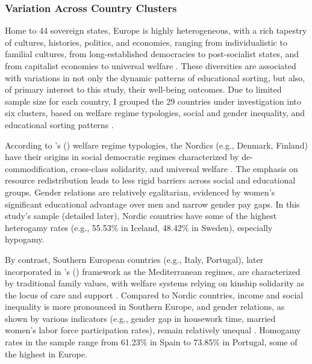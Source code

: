\subsubsection{Variation Across Country Clusters}

Home to 44 sovereign states, Europe is highly heterogeneous, with a rich tapestry of cultures, histories, politics, and economies, ranging from individualistic to familial cultures, from long-established democracies to post-socialist states, and from capitalist economies to universal welfare \parencite{castlesWorldsFamiliesRegimes2008,esping-andersenThreeWorldsWelfare1990,ferreraSouthernModelWelfare1996}. These diversities are associated with variations in not only the dynamic patterns of educational sorting, but also, of primary interest to this study, their well-being outcomes. Due to limited sample size for each country, I grouped the 29 countries under investigation into six clusters, based on welfare regime typologies, social and gender inequality, and educational sorting patterns \parencite{dehauwReversedGenderGap2017,domanskiEducationalHomogamy222007}.

According to \citeauthor{esping-andersenThreeWorldsWelfare1990}'s (\citeyear{esping-andersenThreeWorldsWelfare1990}) welfare regime typologies, the Nordics (e.g., Denmark, Finland) have their origins in social democratic regimes characterized by de-commodification, cross-class solidarity, and universal welfare \parencite{artsModelsWelfareState2010}. The emphasis on resource redistribution leads to less rigid barriers across social and educational groups. Gender relations are relatively egalitarian, evidenced by women's significant educational advantage over men and narrow gender pay gaps. In this study's sample (detailed later), Nordic countries have some of the highest heterogamy rates (e.g., 55.53\% in Iceland, 48.42\% in Sweden), especially hypogamy.

By contrast, Southern European countries (e.g., Italy, Portugal), later incorporated in \citeauthor{esping-andersenThreeWorldsWelfare1990}'s (\citeyear{esping-andersenThreeWorldsWelfare1990}) framework as the Mediterranean regimes, are characterized by traditional family values, with welfare systems relying on kinship solidarity as the locus of care and support \parencite{ferreraSouthernModelWelfare1996}. Compared to Nordic countries, income and social inequality is more pronounced in Southern Europe, and gender relations, as shown by various indicators (e.g., gender gap in housework time, married women's labor force participation rates), remain relatively unequal \parencite{gonzalezGenderInequalitiesSouthern2000,renGenderInequalitiesWork2023}. Homogamy rates in the sample range from 61.23\% in Spain to 73.85\% in Portugal, some of the highest in Europe.


